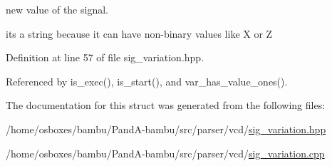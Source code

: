 new value of the signal. 

it\textquotesingle{}s a string because it can have non-\/binary values like X or Z 

Definition at line 57 of file sig\+\_\+variation.\+hpp.



Referenced by is\+\_\+exec(), is\+\_\+start(), and var\+\_\+has\+\_\+value\+\_\+ones().



The documentation for this struct was generated from the following files\+:\begin{DoxyCompactItemize}
\item 
/home/osboxes/bambu/\+Pand\+A-\/bambu/src/parser/vcd/\hyperlink{sig__variation_8hpp}{sig\+\_\+variation.\+hpp}\item 
/home/osboxes/bambu/\+Pand\+A-\/bambu/src/parser/vcd/\hyperlink{sig__variation_8cpp}{sig\+\_\+variation.\+cpp}\end{DoxyCompactItemize}
